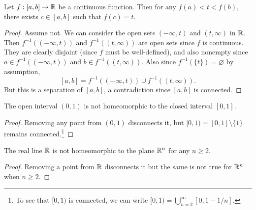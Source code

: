 \begin{corollary}
  Let $f : [a, b] \to \mathbb{R}$ be a continuous function.
  Then
  for any $f(a) < t < f(b)$, there exists
  $c \in [a, b]$ such that $f(c) = t$.
\end{corollary}

\begin{proof}
  Assume not. We can consider the open sets
  $(-\infty, t)$ and $(t, \infty)$ in $\mathbb{R}$. Then
  $f^{-1}((-\infty, t))$ and $f^{-1}((t, \infty))$
  are open sets since $f$ is continuous. They
  are clearly disjoint (since $f$ must be
  well-defined),
  and also nonempty since
  $a \in f^{-1}((-\infty, t))$ and
  $b \in f^{-1}((t, \infty))$. Also since
  $f^{-1}(\{t\}) = \varnothing$ by assumption,
  \[
    [a, b] = f^{-1}((-\infty, t)) \cup f^{-1}((t, \infty)).
  \]
  But this is a separation of $[a, b]$, a
  contradiction since $[a, b]$ is connected.
\end{proof}

\begin{prop}
  The open interval $(0, 1)$ is not
  homeomorphic to the closed interval $[0, 1]$.
\end{prop}

\begin{proof}
  Removing any point from $(0, 1)$ disconnects
  it, but $[0, 1) = [0, 1] \setminus \{1\}$
  remains connected.\footnote{To see that $[0, 1)$ is connected, we can write $[0, 1) = \bigcup_{n = 2}^\infty [0, 1 - 1 / n]$.}
\end{proof}

\begin{prop}
  The real line $\mathbb{R}$ is not homeomorphic
  to the plane $\mathbb{R}^n$ for any $n \ge 2$.
\end{prop}

\begin{proof}
  Removing a point from $\mathbb{R}$ disconnects it but
  the same is not true for $\mathbb{R}^n$ when $n \ge 2$.
\end{proof}
